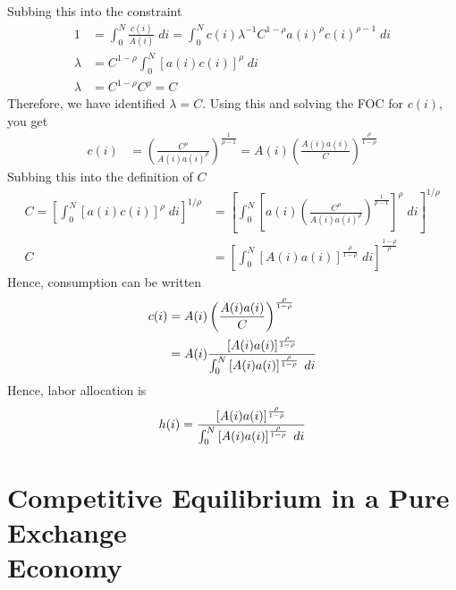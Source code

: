 \documentclass[12pt]{article}
\theoremstyle{plain}
\theoremstyle{definition}
\theoremstyle{remark}
\newcommand{\intzN}{\int_0^N}
\begin{document}
Subbing this into the constraint
\begin{align*}
  1&=
  \intzN \frac{c(i)}{A(i)} \; di
  =
  \intzN
    c(i)
    \lambda^{-1} C^{1-\rho} a(i)^\rho c(i)^{\rho-1}
    \; di \\
  \lambda &=
  C^{1-\rho}
  \intzN
    [a(i)c(i)]^{\rho}
    \; di \\
  \lambda &= C^{1-\rho} C^\rho = C
\end{align*}
Therefore, we have identified $\lambda = C$. Using this and solving the
FOC for $c(i)$, you get
\begin{align*}
  c(i)
  &=
  \left(
  \frac{C^{\rho}}{A(i)a(i)^\rho}
  \right)^{\frac{1}{\rho-1}}
  =
  A(i)
  \left(\frac{A(i)a(i)}{C}\right)^{\frac{\rho}{1-\rho}}
\end{align*}
Subbing this into the definition of $C$
\begin{align*}
  C
  = \left[ \int_0^N [a(i)c(i)]^\rho \; di \right]^{1/\rho}
  &=
  \left[ \int_0^N
    \left[a(i)
    \left(
    \frac{C^{\rho}}{A(i)a(i)^\rho}
    \right)^{\frac{1}{\rho-1}}
    \right]^\rho \; di \right]^{1/\rho} \\
  C
  &=
  \left[ \int_0^N
    \left[
    A(i)a(i)
    \right]^{\frac{\rho}{1-\rho}}
    \; di \right]^{\frac{1-\rho}{\rho}}
\end{align*}
Hence, consumption can be written
\begin{align*}
  c(i)
  &=
  A(i)
  \left(\frac{A(i)a(i)}{C}\right)^{\frac{\rho}{1-\rho}} \\
  &=
  A(i)
  \frac{[A(i)a(i)]^{\frac{\rho}{1-\rho}}}{%
    \int_0^N \left[ A(i)a(i) \right]^{\frac{\rho}{1-\rho}} \; di
  }
\end{align*}
Hence, labor allocation is
\begin{align*}
  h(i) =
  \frac{[A(i)a(i)]^{\frac{\rho}{1-\rho}}}{%
    \int_0^N \left[ A(i)a(i) \right]^{\frac{\rho}{1-\rho}} \; di
  }
\end{align*}


\clearpage
\section{Competitive Equilibrium in a Pure Exchange\\ Economy}
\end{document}
